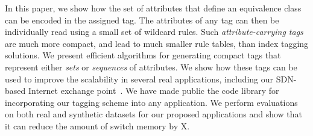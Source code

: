 


In this paper, we show how the set of attributes that define an equivalence class can be encoded in the assigned tag. The attributes of any tag can then be individually read using a small set of wildcard rules.  Such \emph{attribute-carrying tags} are much more compact, and lead to much smaller rule tables, than index tagging solutions.  We present efficient algorithms for generating compact tags that represent either \emph{sets} or \emph{sequences} of attributes.  We show how these tags can be used to improve the scalability in several real applications, including our SDN-based Internet exchange point~\cite{isdx}.  We have made public the code library for incorporating our tagging scheme into any application. We perform evaluations on both real and synthetic datasets for our proposed applications and show that it can reduce the amount of switch memory by X. 


